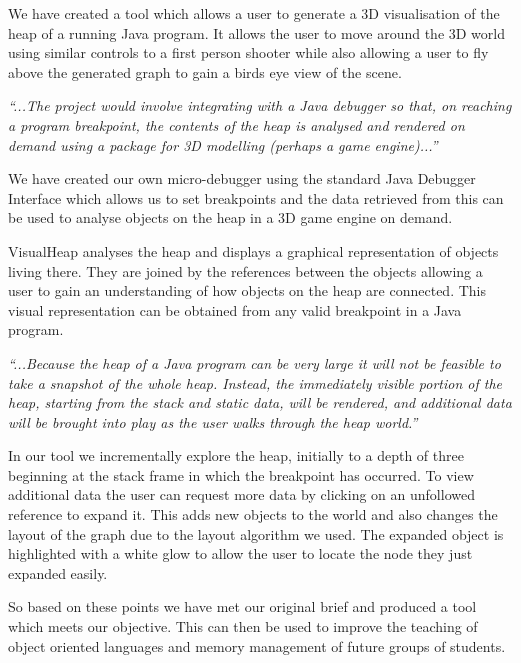 \documentclass[11pt, a4paper]{report}
\begin{document}
We have created a tool which allows a user to generate a 3D visualisation of the heap of a running Java program. It allows the user to move around the 3D world using similar controls to a first person shooter while also allowing a user to fly above the generated graph to gain a birds eye view of the scene. 

\emph{``...The project would involve integrating with a Java debugger so that, on reaching a program breakpoint, the contents of the heap is analysed and rendered on demand using a package for 3D modelling (perhaps a game engine)...''}

We have created our own micro-debugger using the standard Java Debugger Interface which allows us to set breakpoints and the data retrieved from this can be used to analyse objects on the heap in a 3D game engine on demand.

VisualHeap analyses the heap and displays a graphical representation of objects living there. They are joined by the references between the objects allowing a user to gain an understanding of how objects on the heap are connected. This visual representation can be obtained from any valid breakpoint in a Java program.

\emph{``...Because the heap of a Java program can be very large it will not be feasible to take a snapshot of the whole heap. Instead, the immediately visible portion of the heap, starting from the stack and static data, will be rendered, and additional data will be brought into play as the user walks through the heap world.''}

In our tool we incrementally explore the heap, initially to a depth of three beginning at the stack frame in which the breakpoint has occurred. To view additional data the user can request more data by clicking on an unfollowed reference to expand it. This adds new objects to the world and also changes the layout of the graph due to the layout algorithm we used. The expanded object is highlighted with a white glow to allow the user to locate the node they just expanded easily.

So based on these points we have met our original brief and produced a tool which meets our objective. This can then be used to improve the teaching of object oriented languages and memory management of future groups of students. 
\end{document}
